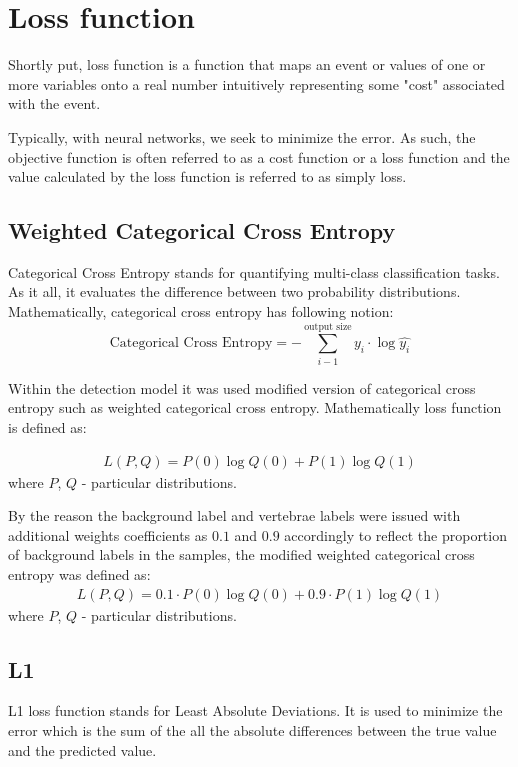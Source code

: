 \section{Loss function}
Shortly put, loss function is a function that maps an event or values of one or more variables onto a real number intuitively representing some "cost" associated with the event. 

Typically, with neural networks, we seek to minimize the error. As such, the objective function is often referred to as a cost function or a loss function and the value calculated by the loss function is referred to as simply loss.

\subsection{Weighted Categorical Cross Entropy}
Categorical Cross Entropy stands for quantifying multi-class classification tasks. As it all, it evaluates the difference between two probability distributions. Mathematically, categorical cross entropy has following notion: \[\text{Categorical Cross Entropy} = - \sum_{i-1}^{\text{output size}} y_i \cdot \log \hat{y_i} \]

Within the detection model it was used modified version of categorical cross entropy such as weighted categorical cross entropy. Mathematically loss function is defined as:

\begin{align*}
 L(P, Q) = P(0)\log Q(0) + P(1)\log Q(1)
\end{align*}
where $P$, $Q$ - particular distributions. 

By the reason the background label and vertebrae labels were issued with additional weights coefficients as $0.1$ and $0.9$ accordingly to reflect the proportion of background labels in the samples, the modified weighted categorical cross entropy was defined as:
\begin{align*}
 L(P, Q) = 0.1 \cdot P(0)\log Q(0) + 0.9 \cdot P(1)\log Q(1)
\end{align*}
where $P$, $Q$ - particular distributions.  

\subsection{L1}
L1 loss function stands for Least Absolute Deviations. It is used to minimize the error which is the sum of the all the absolute differences between the true value and the predicted value.

